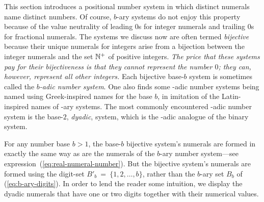 This section introduces a positional number system in which distinct numerals name distinct numbers.  Of course, $b$-ary systems do not enjoy this property because of the value neutrality of leading $0$s for integer numerals and trailing $0$s for fractional numerals.  The systems we discuss now are often termed {\it bijective} because their unique numerals for integers arise from a bijection between the integer numerals and the set $\mathbb{N}^+$ of positive integers.  {\em The price that these systems pay for their bijectiveness is that they cannot represent the number $0$; they can, however, represent all other integers.}  Each bijective base-$b$ system is sometimes called the {\it $b$-adic number system}.  One also finds some -adic number systems being named using Greek-inspired names for the base $b$, in imitation of the Latin-inspired names of -ary
systems.  The most commonly encountered -adic number system is the base-$2$, {\it dyadic},
system, which is the -adic analogue of the binary system.

\medskip

For any number base $b > 1$, the base-$b$ bijective system's numerals are formed in exactly the same way as are the numerals of the $b$-ary number system---see expression~(\ref{eq:real-numeral-number}).  But the bijective system's numerals are formed using the digit-set $B'_b \ = \ \{1, 2, \ldots, b\}$, rather than the $b$-ary set $B_b$ of (\ref{eq:b-ary-digits}).  In order to lend the reader some intuition, we display the dyadic numerals that have one or two digits together with their numerical values.

\medskip



